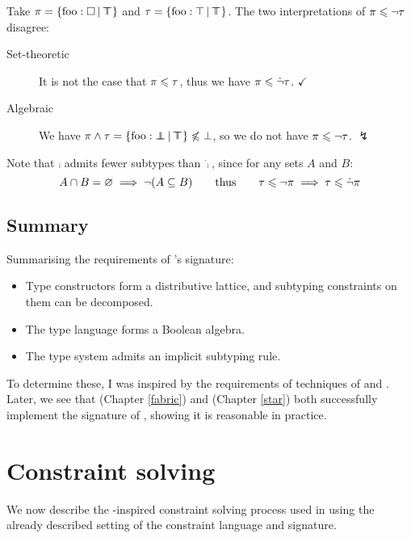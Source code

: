 \begin{example}
    Take $\pi = \flext{\mathrm{foo}: \flabsent }{\flftop}$ and $\tau = \flext{\mathrm{foo}: \top}{\flftop}$. The two interpretations of $\pi \leqslant \lnot \tau$ disagree: \begin{description}
        \item[Set-theoretic] It is not the case that $\pi \leqslant \tau$, thus we have $\pi \leqslant \dot {\lnot} \tau$. $\checkmark$
        \item[Algebraic] We have $\pi \meet \tau = \flext{\mathrm{foo} : \flfbot }{\flftop} \not\sub \bot$, so we do not have $\pi \leqslant \lnot \tau$. $\lightning$
        \end{description}
    Note that $\comp$ admits fewer subtypes than $\dot \comp$, since for any sets $A$ and $B$: 
    $$A \cap B = \varnothing \implies \lnot(A \subseteq B) \qquad\text{thus}\qquad \tau \leqslant \lnot \pi \implies \tau \leqslant \dot{\lnot} \pi $$ 
\end{example}

\subsection{Summary} Summarising the requirements of \inference{}'s signature: \begin{itemize}
    \item Type constructors form a distributive lattice, and subtyping constraints on them 
    can be decomposed.
    \item The type language forms a Boolean algebra.
    \item The type system admits an implicit subtyping rule.
\end{itemize} 
To determine these, I was inspired by the requirements of techniques of \textcite{mlsub} and \textcite{mlstruct}.
Later, we see that \fabric{} (Chapter \ref{fabric}) and \starr{} (Chapter \ref{star}) both successfully implement the signature of \inference{}, showing it is reasonable in practice.

\section{Constraint solving}
\label{sec:constraints}

We now describe the \mlstruct{}-inspired constraint solving process used in \inference{} using the already described setting of the constraint language and signature. 

